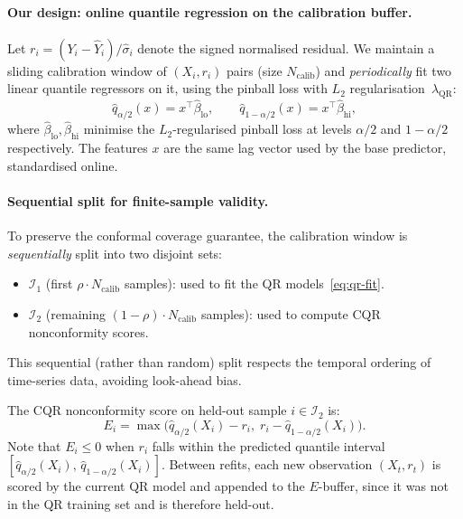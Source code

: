 \paragraph{Our design: online quantile regression on the calibration buffer.}
Let $r_i = (Y_i - \hat{Y}_i) / \hat{\sigma}_i$ denote the signed
normalised residual.  We maintain a sliding calibration window of
$(X_i, r_i)$ pairs (size $N_{\mathrm{calib}}$) and \emph{periodically}
fit two linear quantile regressors on it, using the pinball loss with
$L_2$ regularisation~$\lambda_{\mathrm{QR}}$:
\begin{equation}\label{eq:qr-fit}
  \hat{q}_{\alpha/2}(x) = x^\top \hat{\beta}_{\mathrm{lo}},
  \qquad
  \hat{q}_{1-\alpha/2}(x) = x^\top \hat{\beta}_{\mathrm{hi}},
\end{equation}
where $\hat{\beta}_{\mathrm{lo}}, \hat{\beta}_{\mathrm{hi}}$ minimise
the $L_2$-regularised pinball loss at levels $\alpha/2$ and
$1-\alpha/2$ respectively.  The features $x$ are the same lag vector
used by the base predictor, standardised online.

\paragraph{Sequential split for finite-sample validity.}
To preserve the conformal coverage guarantee, the calibration window is
\emph{sequentially} split into two disjoint sets:
\begin{itemize}
  \item $\mathcal{I}_1$ (first $\rho \cdot N_{\mathrm{calib}}$ samples):
    used to fit the QR models~\eqref{eq:qr-fit}.
  \item $\mathcal{I}_2$ (remaining $(1-\rho) \cdot N_{\mathrm{calib}}$
    samples): used to compute CQR nonconformity scores.
\end{itemize}
This sequential (rather than random) split respects the temporal ordering
of time-series data, avoiding look-ahead bias.

The CQR nonconformity score on held-out sample $i \in \mathcal{I}_2$ is:
\begin{equation}\label{eq:cqr-score}
  E_i = \max\!\bigl(\hat{q}_{\alpha/2}(X_i) - r_i,\;
  r_i - \hat{q}_{1-\alpha/2}(X_i)\bigr).
\end{equation}
Note that $E_i \le 0$ when $r_i$ falls within the predicted quantile
interval $[\hat{q}_{\alpha/2}(X_i),\, \hat{q}_{1-\alpha/2}(X_i)]$.
Between refits, each new observation $(X_t, r_t)$ is scored by the
current QR model and appended to the $E$-buffer, since it was not in
the QR training set and is therefore held-out.

